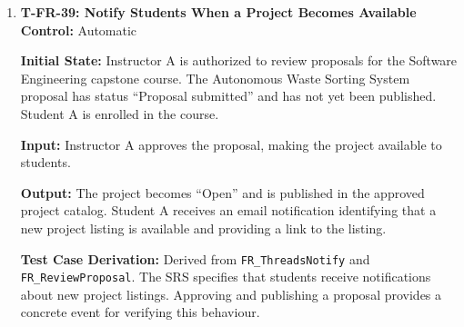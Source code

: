 \documentclass[12pt, titlepage]{article}
\begin{document}
\begin{enumerate}
\textbf{Control:} Automatic

\textbf{Initial State:} Team Amazing Engineers has submitted an application to Autonomous Waste Sorting System with status ``Applied''. The supervisor has not made a decision, and Team Amazing Engineers's members have valid registered email addresses.

\textbf{Input:} The supervisor accepts Team Amazing Engineers's application.

\textbf{Output:} The application changes to ``Supervisor Accepts''. Relevant authorized members of Team Amazing Engineers receive an email notification identifying the supervisor's decision and providing a link to the application. No unrelated student receives the notification.

\textbf{Test Case Derivation:} Derived from \texttt{FR\_ThreadsNotify} and \texttt{FR\_DeclineTeam}. The SRS requires notification of decisions on project applications and agreements. The scenario verifies that relevant users are notified following a supervisor decision.

\textbf{How Test Will Be Performed:} Using Playwright, authenticate as the supervisor and accept the application. Capture outgoing emails using the test email service. Verify the event summary, application link, recipient, and corresponding application status.

\item \label{T-FR-39}\textbf{T-FR-39: Notify Students When a Project Becomes Available}\\

\textbf{Control:} Automatic

\textbf{Initial State:} Instructor A is authorized to review proposals for the Software Engineering capstone course. The Autonomous Waste Sorting System proposal has status ``Proposal submitted'' and has not yet been published. Student A is enrolled in the course.

\textbf{Input:} Instructor A approves the proposal, making the project available to students.

\textbf{Output:} The project becomes ``Open'' and is published in the approved project catalog. Student A receives an email notification identifying that a new project listing is available and providing a link to the listing.

\textbf{Test Case Derivation:} Derived from \texttt{FR\_ThreadsNotify} and \texttt{FR\_ReviewProposal}. The SRS specifies that students receive notifications about new project listings. Approving and publishing a proposal provides a concrete event for verifying this behaviour.


\end{enumerate}
\end{document}
